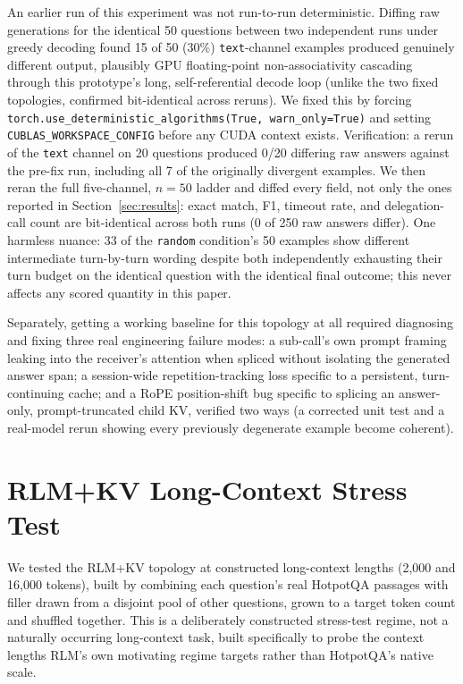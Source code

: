 \documentclass[11pt]{article}
\begin{document}
An earlier run of this experiment was not run-to-run deterministic.
Diffing raw generations for the identical 50 questions between two
independent runs under greedy decoding found 15 of 50 (30\%)
\texttt{text}-channel examples produced genuinely different output,
plausibly GPU floating-point non-associativity cascading through this
prototype's long, self-referential decode loop (unlike the two fixed
topologies, confirmed bit-identical across reruns). We fixed this by
forcing \texttt{torch.use\_deterministic\_algorithms(True,
warn\_only=True)} and setting \texttt{CUBLAS\_WORKSPACE\_CONFIG} before
any CUDA context exists. Verification: a rerun of the \texttt{text}
channel on 20 questions produced 0/20 differing raw answers against the
pre-fix run, including all 7 of the originally divergent examples. We
then reran the full five-channel, $n=50$ ladder and diffed every field,
not only the ones reported in Section~\ref{sec:results}: exact match,
F1, timeout rate, and delegation-call count are bit-identical across
both runs (0 of 250 raw answers differ). One harmless nuance: 33 of the
\texttt{random} condition's 50 examples show different intermediate
turn-by-turn wording despite both independently exhausting their turn
budget on the identical question with the identical final outcome; this
never affects any scored quantity in this paper.

Separately, getting a working baseline for this topology at all
required diagnosing and fixing three real engineering failure modes: a
sub-call's own prompt framing leaking into the receiver's attention
when spliced without isolating the generated answer span; a
session-wide repetition-tracking loss specific to a persistent,
turn-continuing cache; and a RoPE position-shift bug specific to
splicing an answer-only, prompt-truncated child KV, verified two ways
(a corrected unit test and a real-model rerun showing every previously
degenerate example become coherent).

\section{RLM+KV Long-Context Stress Test}
\label{app:longcontext}

We tested the RLM+KV topology at constructed long-context lengths
(2,000 and 16,000 tokens), built by combining each question's real
HotpotQA passages with filler drawn from a disjoint pool of other
questions, grown to a target token count and shuffled together. This
is a deliberately constructed stress-test regime, not a naturally
occurring long-context task, built specifically to probe the context
lengths RLM's own motivating regime targets rather than HotpotQA's
native scale.
\end{document}
